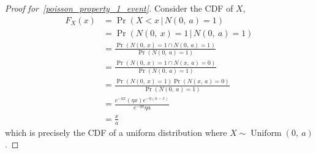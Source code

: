\documentclass{article}
\begin{document}
\begin{proof}[Proof for~\ref{poisson_property_1_event}]
    Consider the CDF of \(X\),
    \begin{align*}
        F_X\left( x \right) & = \Pr{\left( X < x \,\vert\, N\left( 0,\: a \right) = 1 \right)}                                                                                       \\
                            & = \Pr{\left( N\left( 0,\: x \right) = 1 \,\vert\, N\left( 0,\: a \right) = 1 \right)}                                                                  \\
                            & = \frac{\Pr{\left( N\left( 0,\: x \right) = 1 \cap N\left( 0,\: a \right) = 1 \right)}}{\Pr{\left( N\left( 0,\: a \right) = 1 \right)}}                \\
                            & = \frac{\Pr{\left( N\left( 0,\: x \right) = 1 \cap N\left( x,\: a \right) = 0 \right)}}{\Pr{\left( N\left( 0,\: a \right) = 1 \right)}}                \\
                            & = \frac{\Pr{\left( N\left( 0,\: x \right) = 1 \right)} \Pr{\left( N\left( x,\: a \right) = 0 \right)}}{\Pr{\left( N\left( 0,\: a \right) = 1 \right)}} \\
                            & = \frac{e^{-\eta x} \left( \eta x \right) e^{-\eta \left( a - x \right)}}{e^{-\eta a} \eta a}                                                          \\
                            & = \frac{x}{a}
    \end{align*}
    which is precisely the CDF of a uniform distribution where \(X \sim \operatorname{Uniform}{\left( 0,\: a \right)}\).
\end{proof}
\end{document}

